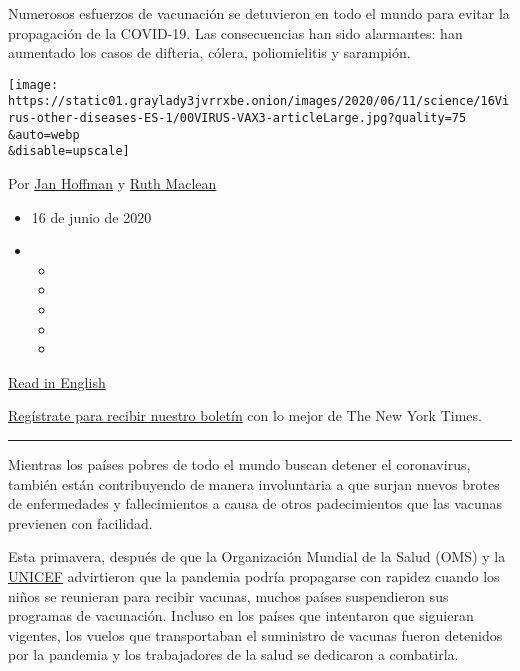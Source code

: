 Numerosos esfuerzos de vacunación se detuvieron en todo el mundo para
evitar la propagación de la COVID-19. Las consecuencias han sido
alarmantes: han aumentado los casos de difteria, cólera, poliomielitis y
sarampión.

\texttt{[image: https://static01.graylady3jvrrxbe.onion/images/2020/06/11/science/16Virus-other-diseases-ES-1/00VIRUS-VAX3-articleLarge.jpg?quality=75\\\&auto=webp\\\&disable=upscale]}

Por \href{https://www.nytimes3xbfgragh.onion/by/jan-hoffman}{Jan
Hoffman} y
\href{https://www.nytimes3xbfgragh.onion/by/ruth-maclean}{Ruth Maclean}

\begin{itemize}
\item
  16 de junio de 2020
\item
  \begin{itemize}
  \item
  \item
  \item
  \item
  \item
  \end{itemize}
\end{itemize}

\href{https://www.nytimes3xbfgragh.onion/2020/06/14/health/coronavirus-vaccines-measles.html}{Read
in English}

\href{https://www.nytimes3xbfgragh.onion/newsletters/el-times}{Regístrate
para recibir nuestro boletín} con lo mejor de The New York Times.

\begin{center}\rule{0.5\linewidth}{\linethickness}\end{center}

Mientras los países pobres de todo el mundo buscan detener el
coronavirus, también están contribuyendo de manera involuntaria a que
surjan nuevos brotes de enfermedades y fallecimientos a causa de otros
padecimientos que las vacunas previenen con facilidad.

Esta primavera, después de que la Organización Mundial de la Salud (OMS)
y la \href{https://www.unicef.org/immunization}{UNICEF} advirtieron que
la pandemia podría propagarse con rapidez cuando los niños se reunieran
para recibir vacunas, muchos países suspendieron sus programas de
vacunación. Incluso en los países que intentaron que siguieran vigentes,
los vuelos que transportaban el suministro de vacunas fueron detenidos
por la pandemia y los trabajadores de la salud se dedicaron a
combatirla.

